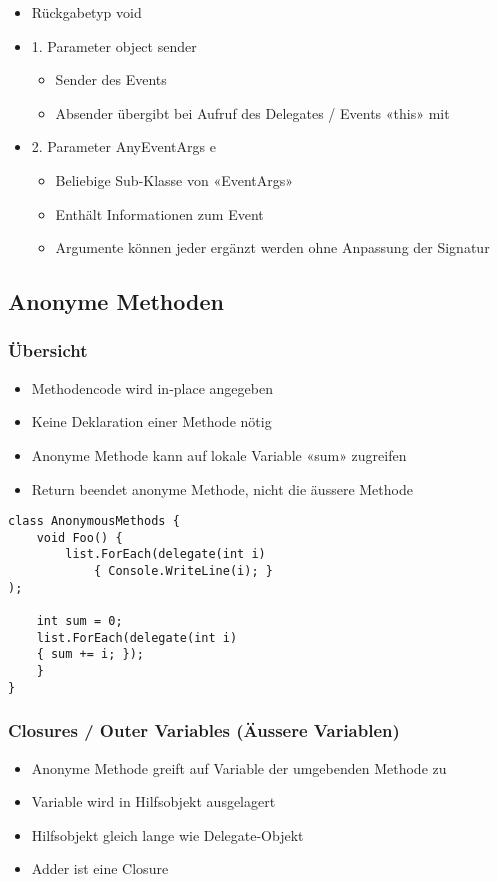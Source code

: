 \begin{itemize}
    \item Rückgabetyp void
    \item 1. Parameter object sender
    \begin{itemize}
        \item Sender des Events
        \item Absender übergibt bei Aufruf des Delegates / Events «this» mit
    \end{itemize}
    \item 2. Parameter AnyEventArgs e
    \begin{itemize}
        \item Beliebige Sub-Klasse von «EventArgs»
        \item Enthält Informationen zum Event
        \item Argumente können jeder ergänzt werden ohne Anpassung der Signatur
    \end{itemize}
\end{itemize}

\subsection{Anonyme Methoden}

\subsubsection{Übersicht}
\begin{itemize}
    \item Methodencode wird in-place angegeben
    \item Keine Deklaration einer Methode nötig
    \item Anonyme Methode kann auf lokale Variable «sum» zugreifen
    \item Return beendet anonyme Methode, nicht die äussere Methode
\end{itemize}
\begin{lstlisting}
class AnonymousMethods {
    void Foo() {
        list.ForEach(delegate(int i)
            { Console.WriteLine(i); }
);

    int sum = 0;
    list.ForEach(delegate(int i)
    { sum += i; });
    }
}
\end{lstlisting}

\subsubsection{Closures / Outer Variables (Äussere Variablen)}
\begin{itemize}
    \item Anonyme Methode greift auf Variable der umgebenden Methode zu
    \item Variable wird in Hilfsobjekt ausgelagert
    \item Hilfsobjekt gleich lange wie Delegate-Objekt
    \item Adder ist eine Closure
\end{itemize}